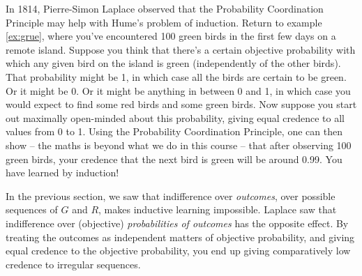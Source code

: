 In 1814, Pierre-Simon Laplace observed that the Probability Coordination
Principle may help with Hume's problem of induction. Return to example
\ref{ex:grue}, where you've encountered 100 green birds in the first few days on
a remote island. Suppose you think that there's a certain objective
  probability with which any given bird on the island is green (independently
of the other birds). That probability might be 1, in which case all the birds
are certain to be green. Or it might be 0. Or it might be anything in between 0
and 1, in which case you would expect to find some red birds and some green
birds. Now suppose you start out maximally open-minded about this probability,
giving equal credence to all values from 0 to 1. Using the Probability
Coordination Principle, one can then show -- the maths is beyond what we do in
this course -- that after observing 100 green birds, your credence that the next
bird is green will be around 0.99. You have learned by induction!

In the previous section, we saw that indifference over \emph{outcomes}, over
possible sequences of $G$ and $R$, makes inductive learning impossible. Laplace
saw that indifference over (objective) \emph{probabilities of outcomes} has the
opposite effect. By treating the outcomes as independent matters of objective
probability, and giving equal credence to the objective probability, you end up
giving comparatively low credence to irregular sequences.

